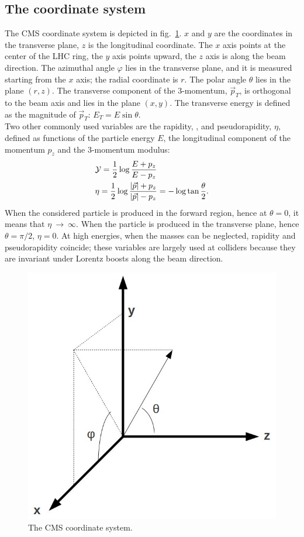 \subsection{The coordinate system}
\label{ssec:coord_syst}
The CMS coordinate system is depicted in fig.~\ref{fig:CMS_CoordSys}. $x$ and $y$ are the coordinates in the transverse plane, $z$ is the longitudinal coordinate. The $x$ axis points at the center of the LHC ring, the $y$ axis points upward, the $z$ axis is along the beam direction. The azimuthal angle $\varphi$ lies in the transverse plane, and it is measured starting from the $x$ axis; the radial coordinate is $r$. The polar angle $\theta$ lies in the plane $(r,z)$. The transverse component of the 3-momentum, $\vec{p}_T$, is orthogonal to the beam axis and lies in the plane $(x,y)$. The transverse energy is defined as the magnitude of $\vec{p}_T$: $E_T = E \sin{\theta}$.\\
Two other commonly used variables are the rapidity, \rap, and pseudorapidity, $\eta$, defined as functions of the particle energy $E$, the longitudinal component of the momentum $p_z$ and the 3-momentum modulus:
\begin{equation}
\begin{split}
 & \mathcal{Y} = \frac{1}{2} \log{\frac{E + p_z}{E - p_z}}\\
 & \eta = \frac{1}{2} \log{\frac{|\vec{p}| + p_z}{|\vec{p}| - p_z}} = -\log{\tan{\frac{\theta}{2}}}.
\end{split}
\end{equation}
When the considered particle is produced in the forward region, hence at $\theta = 0$, it means that $\eta~\rightarrow~\infty$. When the particle is produced in the transverse plane, hence $\theta = \pi /2$, $\eta = 0$. At high energies, when the masses can be neglected, rapidity and pseudorapidity coincide; these variables are largely used at colliders because they are invariant under Lorentz boosts along the beam direction.

\begin{figure}[!htb]
  \centering
    \includegraphics[width=.25\textwidth]{figures/CMS_CoordSys.jpg}
  \caption{The CMS coordinate system.}
  \label{fig:CMS_CoordSys}
\end{figure}

